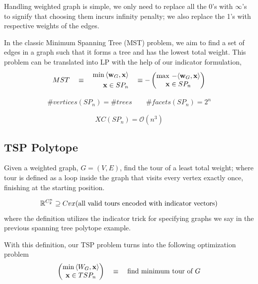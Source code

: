 Handling weighted graph is simple, we only need to replace all the 0's with $\infty$'s to signify that choosing them incurs infinity penalty; we also replace the 1's with respective weights of the edges. 

In the classic Minimum Spanning Tree (MST) problem, we aim to find a set of edges in a graph such that it forms a tree and has the lowest total weight. This problem can be translated into LP with the help of our indicator formulation, 
\begin{equation}
	MST \quad \equiv \quad \begin{aligned}
		\min \, \langle \mathbf{w}_G, \mathbf{x} \rangle \\
		\mathbf{x} \in SP_n
	\end{aligned} \quad \equiv - \begin{pmatrix}
		\max \, - \langle \mathbf{w}_G, \mathbf{x} \rangle \\
		\mathbf{x} \in SP_n
	\end{pmatrix}
\end{equation}

\begin{proposition}
	\begin{align}
		\# vertices (SP_n) = \# trees \quad \quad \# facets (SP_n) = 2^n
	\end{align}
\end{proposition}

\begin{proposition}
	\begin{equation}
		XC(SP_n) = \mathcal O( n^3 )
	\end{equation}
\end{proposition}

\subsection{TSP Polytope}
\begin{definition}
	Given a weighted graph, $G = (V, E)$, find the tour of a least total weight; where tour is defined as a loop inside the graph that visits every vertex exactly once, finishing at the starting position. 
\end{definition}

\begin{definition}
	\begin{equation}
		\mathbb{R}^{C^n_2} \supseteq Cvx (\text{all valid tours encoded with indicator vectors})
	\end{equation}
	where the definition utilizes the indicator trick for specifying graphs we say in the previous spanning tree polytope example. 
	
	With this definition, our TSP problem turns into the following optimization problem 
	\begin{equation}
		\begin{pmatrix}
			\min \, \langle W_G, \mathbf{x} \rangle \\ 
			\mathbf{x} \in TSP_n
		\end{pmatrix}
		\quad 
		\equiv \quad
		\text{find minimum tour of $G$}
	\end{equation}
\end{definition}

